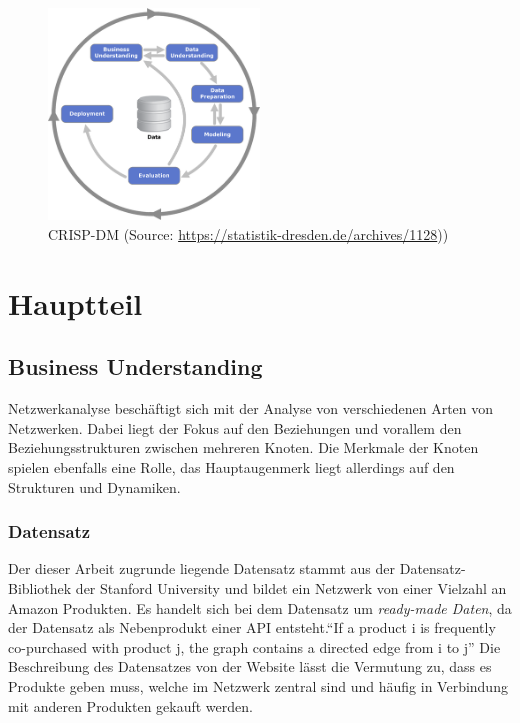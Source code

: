 \documentclass[
  12 pt,
]{article}
\begin{document}
\begin{figure}
\centering
\includegraphics[width=0.5\textwidth,height=\textheight]{Data/CRISP-DM_Process_Diagram1.png}
\caption{CRISP-DM (Source:
\url{https://statistik-dresden.de/archives/1128}))}
\end{figure}

\newpage

\hypertarget{hauptteil}{%
\section{Hauptteil}\label{hauptteil}}

\hypertarget{business-understanding}{%
\subsection{Business Understanding}\label{business-understanding}}

Netzwerkanalyse beschäftigt sich mit der Analyse von verschiedenen Arten
von Netzwerken. Dabei liegt der Fokus auf den Beziehungen und vorallem
den Beziehungsstrukturen zwischen mehreren Knoten. Die Merkmale der
Knoten spielen ebenfalls eine Rolle, das Hauptaugenmerk liegt allerdings
auf den Strukturen und Dynamiken.

\hypertarget{datensatz}{%
\subsubsection{Datensatz}\label{datensatz}}

Der dieser Arbeit zugrunde liegende Datensatz stammt aus der
Datensatz-Bibliothek der Stanford University und bildet ein Netzwerk von
einer Vielzahl an Amazon Produkten. Es handelt sich bei dem Datensatz um
\emph{ready-made Daten}, da der Datensatz als Nebenprodukt einer API
entsteht.\newline ``If a product i is frequently co-purchased with
product j, the graph contains a directed edge from i to j'' \newline Die
Beschreibung des Datensatzes von der Website lässt die Vermutung zu,
dass es Produkte geben muss, welche im Netzwerk zentral sind und häufig
in Verbindung mit anderen Produkten gekauft werden.
\end{document}
